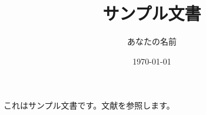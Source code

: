 \documentclass{japanese_thesis}
\title{サンプル文書}
\author{あなたの名前}
\date{\today}
\begin{document}
\maketitle
これはサンプル文書です。文献を参照します。
\nocite{*}
\printbibliography[title=参考文献]
\end{document}
